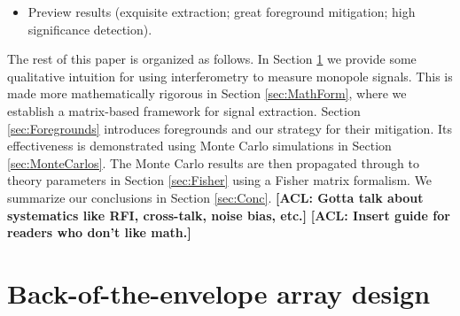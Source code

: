 \documentclass[twolcolumn,apj,iop,numberedappendix]{emulateapj}
\newcommand{\acl}[1]{{\color{red} \textbf{[ACL:  #1]}}}
\newcommand{\mep}[1]{{\color{applegreen} \textbf{[MEP:  #1]}}}
\begin{document}
\begin{itemize}
\item Preview results (exquisite extraction; great foreground mitigation; high significance detection).
\end{itemize}

The rest of this paper is organized as follows.  In Section \ref{sec:BackOfEnvelopeArrayDesign} we provide some qualitative intuition for using interferometry to measure monopole signals.  This is made more mathematically rigorous in Section \ref{sec:MathForm}, where we establish a matrix-based framework for signal extraction.  Section \ref{sec:Foregrounds} introduces foregrounds and our strategy for their mitigation.  Its effectiveness is demonstrated using Monte Carlo simulations in Section \ref{sec:MonteCarlos}.  The Monte Carlo results are then propagated through to theory parameters in Section \ref{sec:Fisher} using a Fisher matrix formalism.  We summarize our conclusions in Section \ref{sec:Conc}.
\acl{Gotta talk about systematics like RFI, cross-talk, noise bias, etc.}
\acl{Insert guide for readers who don't like math.}


%

\section{Back-of-the-envelope array design}
\label{sec:BackOfEnvelopeArrayDesign}
\end{document}
